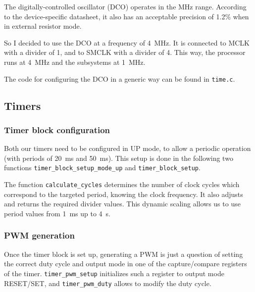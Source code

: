 \documentclass[12pt,a4paper]{article}
\begin{document}
The digitally-controlled oscillator (DCO) operates in the \si{\mega\hertz} range. According to the device-specific datasheet, it also has an acceptable precision of 1.2\% when in external resistor mode.

So I decided to use the DCO at a frequency of \SI{4}{\mega\hertz}. It is connected to MCLK with a divider of 1, and to SMCLK with a divider of 4. This way, the processor runs at \SI{4}{\mega\hertz} and the subsystems at \SI{1}{\mega\hertz}.

The code for configuring the DCO in a generic way can be found in \texttt{time.c}.


\bigskip

\subsection{Timers}

\subsubsection{Timer block configuration}

Both our timers need to be configured in UP mode, to allow a periodic operation (with periods of \SI{20}{\milli\s} and \SI{50}{\milli\s}).  This setup is done in the following two functions \texttt{timer\_block\_setup\_mode\_up} and \texttt{timer\_block\_setup}.
\bigskip\bigskip



The function \texttt{calculate\_cycles} determines the number of clock cycles which correspond to the targeted period, knowing the clock frequency. It also adjusts and returns the required divider values. This dynamic scaling allows us to use period values from \SI{1}{\milli\s} up to \SI{4}{\s}.

\subsubsection{PWM generation}

Once the timer block is set up, generating a PWM is just a question of setting the correct duty cycle and output mode in one of the capture/compare registers of the timer. \texttt{timer\_pwm\_setup} initializes such a register to output mode RESET/SET, and \texttt{timer\_pwm\_duty} allows to modify the duty cycle.


\end{document}
